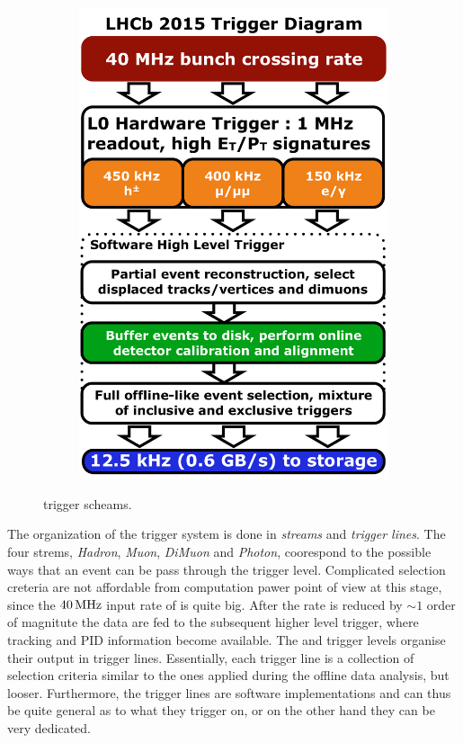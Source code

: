 \begin{figure}[t]
\begin{subfigure}{0.5\textwidth}
    \includegraphics[width=\textwidth]{Figures/Chapter2/LHCb_Trigger_RunII_May2015}
    \caption{}
    \label{det_run_two_trigger}
  \end{subfigure}
  \caption{ trigger scheams.}
  \label{det_trigger_scheams}
\end{figure}

The organization of the trigger system is done in {\it streams} and {\it trigger lines}.
The four strems, {\it Hadron}, {\it Muon}, {\it DiMuon} and {\it Photon}, coorespond to the possible
ways that an event can be pass through the \lzero trigger level. Complicated selection creteria are
not affordable from computation pawer point of view at this stage, since the $40{\rm \,MHz}$ input rate of \lzero is quite
big. After the rate is reduced by $\sim 1$ order of magnitute the data are fed to the subsequent
higher level trigger, where tracking and PID information become available. The \hltone and \hlttwo
trigger levels organise their output in trigger lines. Essentially, each trigger line is a collection
of selection criteria similar to the ones applied during the offline data analysis, but looser.
Furthermore, the trigger lines are software implementations and can thus be quite general as to what
they trigger on, or on the other hand they can be very dedicated.

